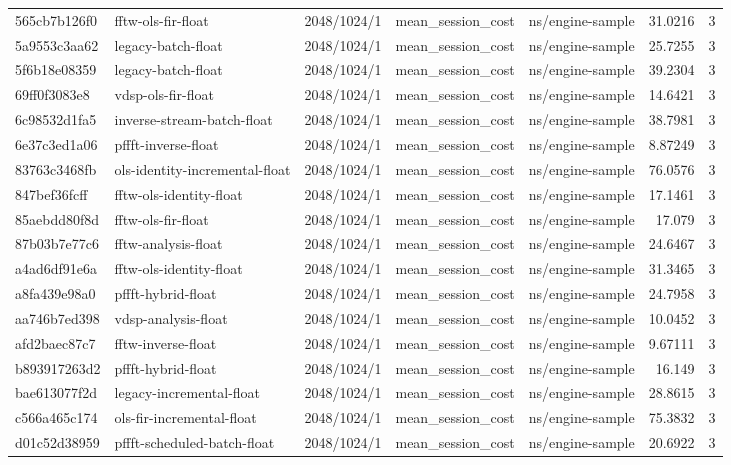 \begin{longtable}{lllllrr}
565cb7b126f0 & fftw-ols-fir-float & 2048/1024/1 & mean\_session\_cost & ns/engine-sample & 31.0216 & 3 \\
5a9553c3aa62 & legacy-batch-float & 2048/1024/1 & mean\_session\_cost & ns/engine-sample & 25.7255 & 3 \\
5f6b18e08359 & legacy-batch-float & 2048/1024/1 & mean\_session\_cost & ns/engine-sample & 39.2304 & 3 \\
69ff0f3083e8 & vdsp-ols-fir-float & 2048/1024/1 & mean\_session\_cost & ns/engine-sample & 14.6421 & 3 \\
6c98532d1fa5 & inverse-stream-batch-float & 2048/1024/1 & mean\_session\_cost & ns/engine-sample & 38.7981 & 3 \\
6e37c3ed1a06 & pffft-inverse-float & 2048/1024/1 & mean\_session\_cost & ns/engine-sample & 8.87249 & 3 \\
83763c3468fb & ols-identity-incremental-float & 2048/1024/1 & mean\_session\_cost & ns/engine-sample & 76.0576 & 3 \\
847bef36fcff & fftw-ols-identity-float & 2048/1024/1 & mean\_session\_cost & ns/engine-sample & 17.1461 & 3 \\
85aebdd80f8d & fftw-ols-fir-float & 2048/1024/1 & mean\_session\_cost & ns/engine-sample & 17.079 & 3 \\
87b03b7e77c6 & fftw-analysis-float & 2048/1024/1 & mean\_session\_cost & ns/engine-sample & 24.6467 & 3 \\
a4ad6df91e6a & fftw-ols-identity-float & 2048/1024/1 & mean\_session\_cost & ns/engine-sample & 31.3465 & 3 \\
a8fa439e98a0 & pffft-hybrid-float & 2048/1024/1 & mean\_session\_cost & ns/engine-sample & 24.7958 & 3 \\
aa746b7ed398 & vdsp-analysis-float & 2048/1024/1 & mean\_session\_cost & ns/engine-sample & 10.0452 & 3 \\
afd2baec87c7 & fftw-inverse-float & 2048/1024/1 & mean\_session\_cost & ns/engine-sample & 9.67111 & 3 \\
b893917263d2 & pffft-hybrid-float & 2048/1024/1 & mean\_session\_cost & ns/engine-sample & 16.149 & 3 \\
bae613077f2d & legacy-incremental-float & 2048/1024/1 & mean\_session\_cost & ns/engine-sample & 28.8615 & 3 \\
c566a465c174 & ols-fir-incremental-float & 2048/1024/1 & mean\_session\_cost & ns/engine-sample & 75.3832 & 3 \\
d01c52d38959 & pffft-scheduled-batch-float & 2048/1024/1 & mean\_session\_cost & ns/engine-sample & 20.6922 & 3 \\

\end{longtable}
